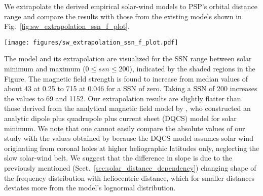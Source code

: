 \documentclass[]{aa}
\begin{document}
        We extrapolate the derived empirical solar-wind models to PSP’s orbital distance range and compare the results with those from the existing models shown in Fig.~\ref{fig:sw_extrapolation_ssn_f_plot}.
        \begin{figure*}
                \texttt{[image: figures/sw\_extrapolation\_ssn\_f\_plot.pdf]}           \caption{Radial extrapolation of the solar-wind parameters to the PSP orbit region. The median values from the models, obtained from Helios and OMNI measurements, are extrapolated to the PSP region for SSN values between solar minimum and maximum, that is, $0 \le ssn \le 200$. The lower edges of the shaded areas correspond to solar minimum, the upper edges to solar maximum. Also plotted are the radial dependencies of the analytic DQCS magnetic field model for solar minimum from \citet{Banaszkiewicz1998}, the slow wind velocity models from \citet{Sheeley1997} and \citet{Wang2000}, the density model from \citet{Leblanc1998} and the range of temperature measurements from \citet{Billings1959} and \citet{Liebenberg1975}.}
                \label{fig:sw_extrapolation_ssn_f_plot}
        \end{figure*}
        The model and its extrapolation are visualized for the SSN range between solar minimum and maximum ($0 \le ssn \le 200$), indicated by the shaded regions in the Figure.
        The magnetic field strength is found to increase from median values of about \SI{43}{\nT} at \SI{0.25}{\au} to \SI{715}{\nT} at \SI{0.046}{\au} for a SSN of zero. Taking a SSN of 200 increases the values to \SI{69}{\nT} and \SI{1152}{\nT}. Our extrapolation results are slightly flatter than those derived from the analytical magnetic field model by \citet{Banaszkiewicz1998}, who constructed an analytic dipole plus quadrupole plus current sheet (DQCS) model for solar minimum. We note that one cannot easily compare the absolute values of our study with the values obtained by \citet{Banaszkiewicz1998} because the DQCS model assumes solar wind originating from coronal holes at higher heliographic latitudes only, neglecting the slow solar-wind belt.
        We suggest that the difference in slope is due to the previously mentioned (Sect.~\ref{sec:solar_distance_dependency}) changing shape of the frequency distribution with heliocentric distance, which for smaller distances deviates more from the model’s lognormal distribution.
\end{document}
